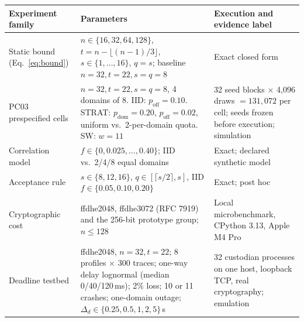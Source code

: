 \begin{tabularx}{\textwidth}{@{}>{\raggedright\arraybackslash}p{}>{\raggedright\arraybackslash}p{}X@{}}
\toprule
Experiment family & Parameters & Execution and evidence label\\
\midrule
Static bound (Eq.~\ref{eq:bound}) & $n\in\{16,32,64,128\}$, $t=n-\lfloor (n-1)/3\rfloor$, $s\in\{1,\dots,16\}$, $q=s$; baseline $n=32,t=22,s=q=8$ & Exact closed form\\
PC03 prespecified cells & $n=32,t=22,s=q=8$, 4 domains of 8. IID: $p_{\mathrm{off}}=0.10$. STRAT: $p_{\mathrm{dom}}=0.20$, $p_{\mathrm{off}}=0.02$, uniform vs.\ 2-per-domain quota. SW: $w=11$ & 32 seed blocks $\times$ 4{,}096 draws $=131{,}072$ per cell; seeds frozen before execution; simulation\\
Correlation model & $f\in\{0,0.025,\dots,0.40\}$; IID vs.\ 2/4/8 equal domains & Exact; declared synthetic model\\
Acceptance rule & $s\in\{8,12,16\}$, $q\in[\lceil s/2\rceil,s]$, IID $f\in\{0.05,0.10,0.20\}$ & Exact; post hoc\\
Cryptographic cost & ffdhe2048, ffdhe3072 (RFC 7919) and the 256-bit prototype group; $n\le 128$ & Local microbenchmark, CPython 3.13, Apple M4 Pro\\
Deadline testbed & ffdhe2048, $n=32,t=22$; 8 profiles $\times$ 300 traces; one-way delay lognormal (median 0/40/120\,ms); 2\% loss; 10 or 11 crashes; one-domain outage; $\Delta_d\in\{0.25,0.5,1,2,5\}$\,s & 32 custodian processes on one host, loopback TCP, real cryptography; emulation\\
\bottomrule
\end{tabularx}
